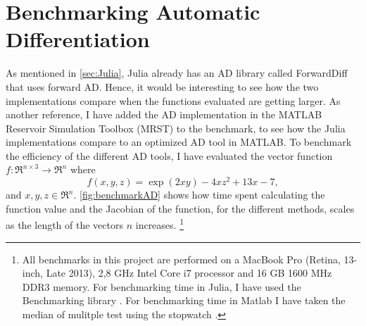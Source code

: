 \section{Benchmarking Automatic Differentiation}
As mentioned in \autoref{sec:Julia}, Julia already has an AD library called ForwardDiff \emph{\citep{ForwardDiff}} that uses forward AD. Hence, it would be interesting to see how the two implementations compare when the functions evaluated are getting larger. As another reference, I have added the AD implementation in the MATLAB Reservoir Simulation Toolbox (MRST) \emph{\citep{mrstHomepage}} to the benchmark, to see how the Julia implementations compare to an optimized AD tool in MATLAB. To benchmark the efficiency of the different AD tools, I have evaluated the vector function $f: \Re^{n\times 3} \rightarrow \Re^n $ where
\begin{equation}
\label{eq:benchmarkFunction}
f(x,y,z)  = \exp(2xy) - 4xz^2 + 13x - 7,
\end{equation}
and $x,y,z \in \Re^n$. \autoref{fig:benchmarkAD} shows how time spent calculating the function value and the Jacobian of the function, for the different methods, scales as the length of the vectors $n$ increases. \footnote{All benchmarks in this project are performed on a MacBook Pro (Retina, 13-inch, Late 2013), 2,8 GHz Intel Core i7 processor and 16 GB 1600 MHz DDR3 memory. For benchmarking time in Julia, I have used the Benchmarking library \emph{\cite{BenchmarkTools}}. For benchmarking time in Matlab I have taken the median of mulitple test using the stopwatch \emph{\cite{TicToc}}.}

